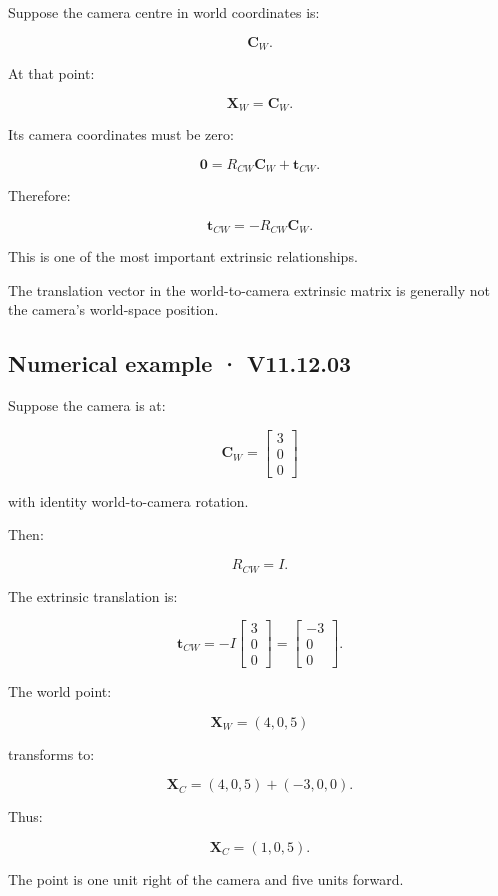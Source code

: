 Suppose the camera centre in world coordinates is:

\[
 \mathbf C_W.
\]

At that point:

\[
 \mathbf X_W=\mathbf C_W.
\]

Its camera coordinates must be zero:

\[
 \mathbf0=R_{CW}\mathbf C_W+\mathbf t_{CW}.
\]

Therefore:

\[
 \boxed{ \mathbf t_{CW}=-R_{CW}\mathbf C_W }.
\]

This is one of the most important extrinsic relationships.

The translation vector in the world-to-camera extrinsic matrix is generally not the camera's world-space position.

\subsection{Numerical example · V11.12.03}\label{02-foundations-ii-ch035-numerical-example-v11.12.03}

Suppose the camera is at:

\[
 \mathbf C_W= \begin{bmatrix}3\\0\\0\end{bmatrix}
\]

with identity world-to-camera rotation.

Then:

\[
 R_{CW}=I.
\]

The extrinsic translation is:

\[
 \mathbf t_{CW}= -I \begin{bmatrix}3\\0\\0\end{bmatrix} = \begin{bmatrix}-3\\0\\0\end{bmatrix}.
\]

The world point:

\[
 \mathbf X_W=(4,0,5)
\]

transforms to:

\[
 \mathbf X_C= (4,0,5)+(-3,0,0).
\]

Thus:

\[
 \boxed{ \mathbf X_C=(1,0,5) }.
\]

The point is one unit right of the camera and five units forward.

